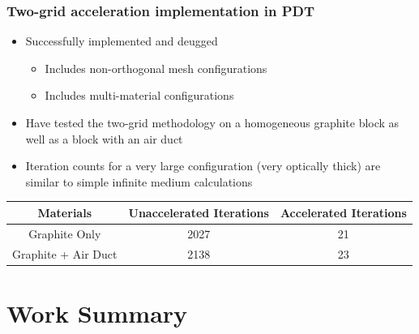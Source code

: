 \documentclass[compress,10pt]{beamer}
\begin{document}
\begin{frame}[t]\frametitle{Two-grid acceleration implementation in PDT}
\begin{block}{}
\begin{itemize}
	\item Successfully implemented and deugged
	\begin{itemize}
		\item Includes non-orthogonal  mesh configurations
		\item Includes multi-material configurations
	\end{itemize}
	\item Have tested the two-grid methodology on a homogeneous graphite block as well as a block with an air duct
	\item Iteration counts for a very large configuration (very optically thick) are similar to simple infinite medium calculations
\end{itemize}
\end{block}
\centering
\vspace{1cm}
\begin{table}
\footnotesize
\begin{tabular}{|c|c|c|}
\hline
Materials & Unaccelerated Iterations & Accelerated Iterations  \\
\hline \hline
Graphite Only & 2027 & 21 \\ \hline
Graphite + Air Duct & 2138 & 23 \\ \hline
\end{tabular}
\end{table}
\end{frame}
\typeout{***********************************************************************************}

\section{Work Summary}
\subsection{}
\end{document}

